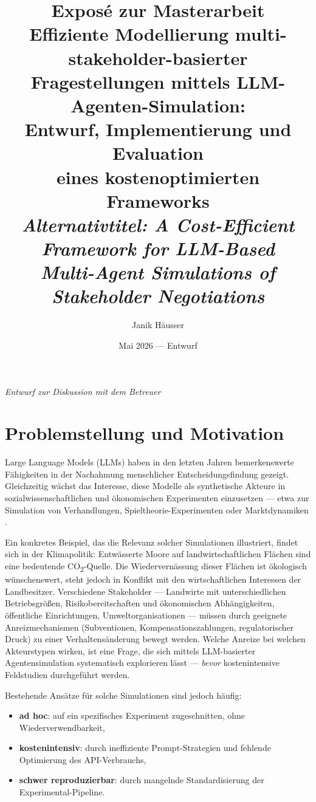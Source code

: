 \documentclass[12pt, a4paper]{article}
\title{%
    \vspace{-1cm}
    \textbf{Exposé zur Masterarbeit}\\[0.8em]
    \Large Effiziente Modellierung multi-stakeholder-basierter\\
    Fragestellungen mittels LLM-Agenten-Simulation:\\[0.3em]
    Entwurf, Implementierung und Evaluation\\
    eines kostenoptimierten Frameworks\\[1em]
    \normalsize\textit{Alternativtitel: A Cost-Efficient Framework for LLM-Based\\
    Multi-Agent Simulations of Stakeholder Negotiations}
}
\author{Janik Häusser}
\date{Mai 2026 — Entwurf}
\begin{document}
\maketitle
\thispagestyle{empty}

\vfill
\begin{center}
    \textit{Entwurf zur Diskussion mit dem Betreuer}
\end{center}
\newpage

\setcounter{page}{1}
\tableofcontents
\newpage

\section{Problemstellung und Motivation}

Large Language Models (LLMs) haben in den letzten Jahren bemerkenswerte Fähigkeiten in der Nachahmung menschlicher Entscheidungsfindung gezeigt. Gleichzeitig wächst das Interesse, diese Modelle als synthetische Akteure in sozialwissenschaftlichen und ökonomischen Experimenten einzusetzen --- etwa zur Simulation von Verhandlungen, Spieltheorie-Experimenten oder Marktdynamiken \cite{horton2023}.

Ein konkretes Beispiel, das die Relevanz solcher Simulationen illustriert, findet sich in der Klimapolitik: Entwässerte Moore auf landwirtschaftlichen Flächen sind eine bedeutende CO\textsubscript{2}-Quelle. Die Wiedervernässung dieser Flächen ist ökologisch wünschenswert, steht jedoch in Konflikt mit den wirtschaftlichen Interessen der Landbesitzer. Verschiedene Stakeholder --- Landwirte mit unterschiedlichen Betriebsgrößen, Risikobereitschaften und ökonomischen Abhängigkeiten, öffentliche Einrichtungen, Umweltorganisationen --- müssen durch geeignete Anreizmechanismen (Subventionen, Kompensationszahlungen, regulatorischer Druck) zu einer Verhaltensänderung bewegt werden. Welche Anreize bei welchen Akteurstypen wirken, ist eine Frage, die sich mittels LLM-basierter Agentensimulation systematisch explorieren lässt --- \textit{bevor} kostenintensive Feldstudien durchgeführt werden.

Bestehende Ansätze für solche Simulationen sind jedoch häufig:
\begin{itemize}
    \item \textbf{ad hoc}: auf ein spezifisches Experiment zugeschnitten, ohne Wiederverwendbarkeit,
    \item \textbf{kostenintensiv}: durch ineffiziente Prompt-Strategien und fehlende Optimierung des API-Verbrauchs,
    \item \textbf{schwer reproduzierbar}: durch mangelnde Standardisierung der Experimental-Pipeline.
\end{itemize}
\end{document}
